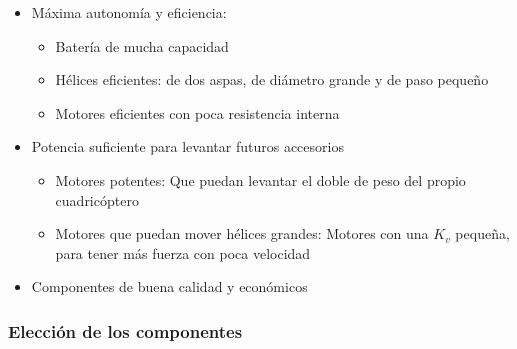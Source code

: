 \documentclass[12pt,twoside]{article}
\begin{document}
		\begin{itemize}
			\item Máxima autonomía y eficiencia:
					
					\begin{itemize}
						\item Batería de mucha capacidad
						\item Hélices eficientes: de dos aspas, de diámetro grande y de paso pequeño
						\item Motores eficientes con poca resistencia interna
					\end{itemize}
			\item Potencia suficiente para levantar futuros accesorios
				
				\begin{itemize}
					\item Motores potentes: Que puedan levantar el doble de peso del propio cuadricóptero
					\item Motores que puedan mover hélices grandes: Motores con una $K_{v}$ pequeña, para tener más fuerza con poca velocidad 
				\end{itemize}
			\item Componentes de buena calidad y económicos
		\end{itemize}
	
	\subsubsection{Elección de los componentes}\label{subsubsec:eleccion}
			
\end{document}
